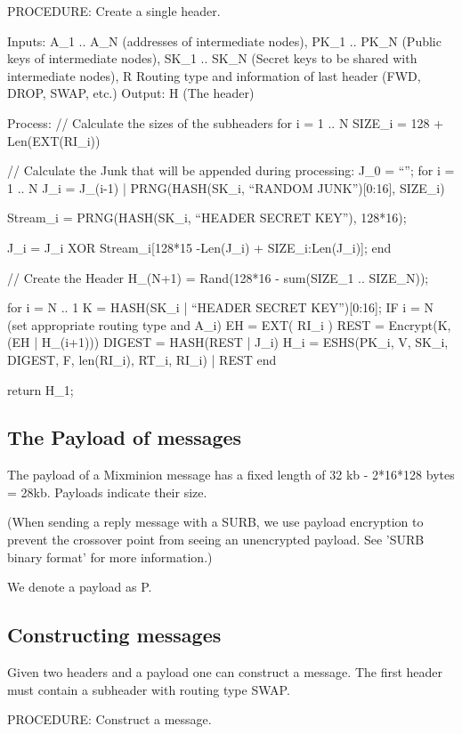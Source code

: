 PROCEDURE: Create a single header.

Inputs: A_1 .. A_N (addresses of intermediate nodes), 
	PK_1 .. PK_N (Public keys of intermediate nodes),
	SK_1 .. SK_N (Secret keys to be shared with intermediate nodes),
        R Routing type and information of last header (FWD, DROP, SWAP, etc.)
Output: H (The header)

Process: 
  // Calculate the sizes of the subheaders
  for i = 1 .. N
	SIZE_i = 128 + Len(EXT(RI_i))

  // Calculate the Junk that will be appended during processing:
  J_0 = ``'';
  for i = 1 .. N
	J_i = J_(i-1) | PRNG(HASH(SK_i, ``RANDOM JUNK'')[0:16], SIZE_i)

        Stream_i = PRNG(HASH(SK_i, ``HEADER SECRET KEY''), 128*16);

	J_i = J_i XOR Stream_i[128*15 -Len(J_i) + SIZE_i:Len(J_i)];
  end

  // Create the Header
  H_(N+1) = Rand(128*16 - sum(SIZE_1 .. SIZE_N));

  for i = N .. 1
	K = HASH(SK_i | ``HEADER SECRET KEY'')[0:16];
	IF i = N (set appropriate routing type and A_i)
	EH = EXT( RI_i )
        REST = Encrypt(K, (EH | H_(i+1)))
  	DIGEST = HASH(REST | J_i)
	H_i = ESHS(PK_i, V, SK_i, DIGEST, F, len(RI_i), RT_i, RI_i) | REST
  end

return H_1;

\subsection{The Payload of messages}

The payload of a Mixminion message has a fixed length of 32 kb
- 2*16*128 bytes = 28kb.   Payloads indicate their size.

(When sending a reply message with a SURB, we use payload encryption
to prevent the crossover point from seeing an unencrypted payload. See
'SURB binary format' for more information.)

We denote a payload as P.

\subsection{Constructing messages}

Given two headers and a payload one can construct a
message. The first header must contain a subheader
with routing type SWAP.  

PROCEDURE: Construct a message.


